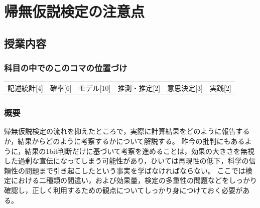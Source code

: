 \section{帰無仮説検定の注意点}
\label{D1_lesson19}

\subsection{授業内容}
\subsubsection{科目の中でのこのコマの位置づけ}
\begin{tabular}[t]{cccccc}
    記述統計[4] & 確率[6] & モデル[10] & 推測・推定[2] & 意思決定[3] & 実践[2]
\end{tabular}

\subsubsection{概要}
帰無仮説検定の流れを抑えたところで，実際に計算結果をどのように報告するか，結果からどのように考察するかについて解説する。
昨今の批判にもあるように，結果の1bit判断だけに基づいて考察を進めることは，効果の大きさを無視した過剰な宣伝になってしまう可能性があり，ひいては再現性の低下，科学の信頼性の問題まで引き起こしたという事実を学ばなければならない。
ここでは検定における二種類の間違い，および効果量，検定の多重性の問題などをしっかり確認し，正しく利用するための観点についてしっかり身につけておく必要がある。

